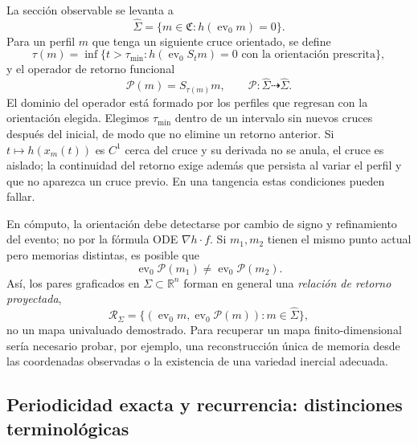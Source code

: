 La sección observable se levanta a
\begin{equation}
 \widehat\Sigma=
 \{m\in\mathfrak C:h(\operatorname{ev}_0m)=0\}.
 \label{eq:geofo-functional-section}
\end{equation}
Para un perfil \(m\) que tenga un siguiente cruce orientado, se define
\begin{equation}
 \tau(m)=\inf\{t>\tau_{\min}:
 h(\operatorname{ev}_0S_tm)=0
 \text{ con la orientación prescrita}\},
 \label{eq:geofo-return-time}
\end{equation}
y el operador de retorno funcional
\begin{equation}
 \mathcal P(m)=S_{\tau(m)}m,
 \qquad \mathcal P:\widehat\Sigma\dashrightarrow\widehat\Sigma.
 \label{eq:geofo-functional-poincare}
\end{equation}
El dominio del operador está formado por los perfiles que regresan con
la orientación elegida. Elegimos \(\tau_{\min}\) dentro de un intervalo
sin nuevos cruces después del inicial, de modo que no elimine un retorno
anterior. Si \(t\mapsto h(x_m(t))\) es \(C^1\) cerca del cruce y su
derivada no se anula, el cruce es aislado; la continuidad del retorno exige
además que persista al variar el perfil y que no aparezca un cruce previo.
En una tangencia estas condiciones pueden fallar.

En cómputo, la orientación debe detectarse por cambio de signo y refinamiento
del evento; no por la fórmula ODE \(\nabla h\cdot f\). Si \(m_1,m_2\) tienen
el mismo punto actual pero memorias distintas, es posible que
\begin{equation}
 \operatorname{ev}_0\mathcal P(m_1)\neq
 \operatorname{ev}_0\mathcal P(m_2).
 \label{eq:geofo-multivalued-projection}
\end{equation}
Así, los pares graficados en \(\Sigma\subset\mathbb R^n\) forman en general
una \emph{relación de retorno proyectada},
\begin{equation}
 \mathcal R_\Sigma=
 \{(\operatorname{ev}_0m,
 \operatorname{ev}_0\mathcal P(m)):m\in\widehat\Sigma\},
 \label{eq:geofo-projected-return-relation}
\end{equation}
no un mapa univaluado demostrado. Para recuperar un mapa finito-dimensional
sería necesario probar, por ejemplo, una reconstrucción única de memoria desde
las coordenadas observadas o la existencia de una variedad inercial adecuada.



\subsection{Periodicidad exacta y recurrencia: distinciones terminológicas}

